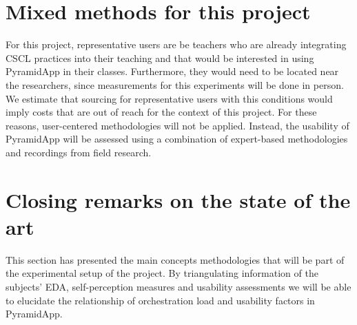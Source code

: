 \section {Mixed methods for this project}
For this project, representative users are be teachers who are already integrating CSCL practices into their teaching and that would be interested in using PyramidApp in their classes. Furthermore, they would need to be located near the researchers, since measurements for this experiments will be done in person. We estimate that sourcing for representative users with this conditions would imply costs that are out of reach for the context of this project. For these reasons, user-centered methodologies will not be applied. Instead, the usability of PyramidApp will be assessed using a combination of expert-based methodologies and recordings from field research.
\section{Closing remarks on the state of the art}
This section has presented the main concepts methodologies that will be part of the experimental setup of the project. By triangulating information of the subjects' EDA, self-perception measures and usability assessments we will be able to elucidate the relationship of orchestration load and usability factors in PyramidApp.
\newpage



